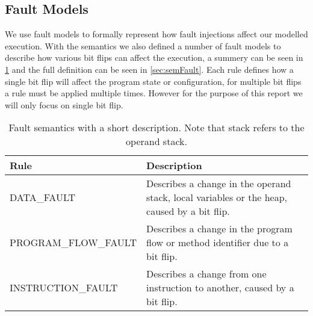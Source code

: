 \subsection{Fault Models}
We use fault models to formally represent how fault injections affect our modelled execution. With the \jcl semantics we also defined a number of fault models to describe how various bit flips can affect the execution, a summery can be seen in \cref{tab:fault} and the full definition can be seen in \cref{sec:semFault}. Each rule defines how a single bit flip will affect the program state or configuration, for multiple bit flips a rule must be applied multiple times. However for the purpose of this report we will only focus on single bit flip.


\begin{table}[H]
\centering
\label{tab:fault}
\begin{tabular}{p{}|p{}}
\textbf{Rule} 					  & \textbf{Description} \\ \hline
DATA\_FAULT             		  & Describes a change in the operand stack, local variables or the heap, caused by a bit flip.\\ \hline 
PROGRAM\_FLOW\_FAULT			  & Describes a change in the program flow or method identifier due to a bit flip. \\ \hline
INSTRUCTION\_FAULT				  & Describes a change from one instruction to another, caused by a bit flip. \\ \hline
\end{tabular}
\caption{Fault semantics with a short description. Note that stack refers to the operand stack.}
\end{table}